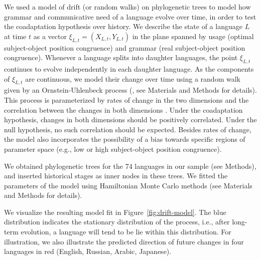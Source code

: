 \documentclass[9pt,twocolumn,twoside,lineno]{pnas-new}
\begin{document}
We used a model of drift (or random walks) on phylogenetic trees \citep{felsenstein1973maximum,pagel1997inferring, pagel2004bayesian} to model how grammar and communicative need of a language evolve over time, in order to test the coadaptation hypothesis over history.
We describe the state of a language $L$ at time $t$ as a vector $\xi_{L,t} = (X_{L,t}, Y_{L,t})$ in the plane spanned by usage (optimal subject-object position congruence) and grammar (real subject-object position congruence).
Whenever a language splits into daughter languages, the point $\xi_{L,t}$ continues to evolve independently in each daughter language.
As the components of $\xi_{L,t}$ are continuous, we model their change over time using a random walk given by an Ornstein-Uhlenbeck process (\citep{felsenstein1988phylogenies,hansen1997stabilizing, blackwell2003bayesian}, see Materials and Methods for details).
This process is parameterized by rates of change in the two dimensions and the correlation between the changes in both dimensions \citep{felsenstein1973maximum,hansen1997stabilizing, freckleton2012fast}.
Under the coadaptation hypothesis, changes in both dimensions should be positively correlated.
Under the null hypothesis, no such correlation should be expected.
Besides rates of change, the model also incorporates the possibility of a bias towards specific regions of parameter space (e.g., low or high subject-object position congruence).

We obtained phylogenetic trees for the 74 languages in our sample (see Methods), and inserted historical stages as inner nodes in these trees.
We fitted the parameters of the model using Hamiltonian Monte Carlo methods (see Materials and Methods for details).







We visualize the resulting model fit in Figure~\ref{fig:drift-model}.
The blue distribution indicates the stationary distribution of the process, i.e., after long-term evolution, a language will tend to be lie within this distribution.
For illustration, we also illustrate the predicted direction of future changes in four languages in red (English, Russian, Arabic, Japanese).
\end{document}
